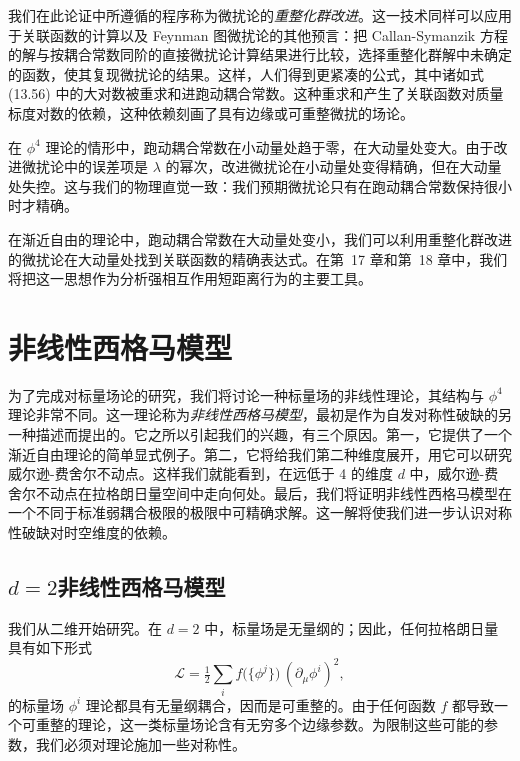 我们在此论证中所遵循的程序称为微扰论的\emph{重整化群改进}。这一技术同样可以应用于关联函数的计算以及 Feynman 图微扰论的其他预言：把 Callan-Symanzik 方程的解与按耦合常数同阶的直接微扰论计算结果进行比较，选择重整化群解中未确定的函数，使其复现微扰论的结果。这样，人们得到更紧凑的公式，其中诸如式 (13.56) 中的大对数被重求和进跑动耦合常数。这种重求和产生了关联函数对质量标度对数的依赖，这种依赖刻画了具有边缘或可重整微扰的场论。

在 $\phi^4$ 理论的情形中，跑动耦合常数在小动量处趋于零，在大动量处变大。由于改进微扰论中的误差项是 $\lambda$ 的幂次，改进微扰论在小动量处变得精确，但在大动量处失控。这与我们的物理直觉一致：我们预期微扰论只有在跑动耦合常数保持很小时才精确。

在渐近自由的理论中，跑动耦合常数在大动量处变小，我们可以利用重整化群改进的微扰论在大动量处找到关联函数的精确表达式。在第~17 章和第~18 章中，我们将把这一思想作为分析强相互作用短距离行为的主要工具。

\section{非线性西格马模型}

为了完成对标量场论的研究，我们将讨论一种标量场的非线性理论，其结构与 $\phi^4$ 理论非常不同。这一理论称为\emph{非线性西格马模型}，最初是作为自发对称性破缺的另一种描述而提出的。它之所以引起我们的兴趣，有三个原因。第一，它提供了一个渐近自由理论的简单显式例子。第二，它将给我们第二种维度展开，用它可以研究威尔逊-费舍尔不动点。这样我们就能看到，在远低于 4 的维度 $d$ 中，威尔逊-费舍尔不动点在拉格朗日量空间中走向何处。最后，我们将证明非线性西格马模型在一个不同于标准弱耦合极限的极限中可精确求解。这一解将使我们进一步认识对称性破缺对时空维度的依赖。

\subsection{$d = 2$非线性西格马模型}

我们从二维开始研究。在 $d = 2$ 中，标量场是无量纲的；因此，任何拉格朗日量具有如下形式
\begin{equation}
  \mathcal{L} = \tfrac{1}{2}\sum_i f\bigl( \{\phi^j\} \bigr)\,
    (\partial_\mu\phi^i)^2 ,
  \label{eq:13.65}
\end{equation}
的标量场 $\phi^i$ 理论都具有无量纲耦合，因而是可重整的。由于任何函数 $f$ 都导致一个可重整的理论，这一类标量场论含有无穷多个边缘参数。为限制这些可能的参数，我们必须对理论施加一些对称性。

